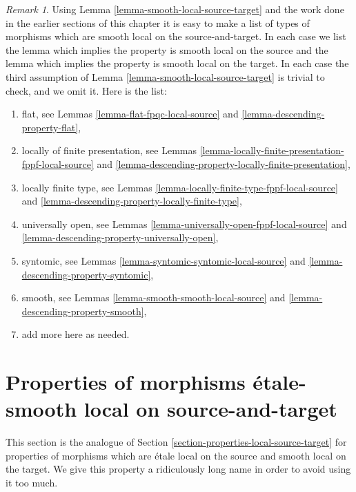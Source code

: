 \documentclass{stacks-project}
\theoremstyle{plain}
\theoremstyle{definition}
\theoremstyle{remark}
\newtheorem{remark}[subsection]{Remark}
\numberwithin{equation}{subsection}
\begin{document}
\begin{remark}
\label{remark-list-local-source-target}
Using
Lemma \ref{lemma-smooth-local-source-target}
and the work done in the earlier sections of this chapter it is easy
to make a list of types of morphisms which are smooth local on the
source-and-target. In each case we list the lemma which implies
the property is smooth local on the source and the lemma which implies
the property is smooth local on the target. In each case the third assumption
of
Lemma \ref{lemma-smooth-local-source-target}
is trivial to check, and we omit it. Here is the list:
\begin{enumerate}
\item flat, see
Lemmas \ref{lemma-flat-fpqc-local-source} and
\ref{lemma-descending-property-flat},
\item locally of finite presentation, see
Lemmas \ref{lemma-locally-finite-presentation-fppf-local-source} and
\ref{lemma-descending-property-locally-finite-presentation},
\item locally finite type, see
Lemmas \ref{lemma-locally-finite-type-fppf-local-source} and
\ref{lemma-descending-property-locally-finite-type},
\item universally open, see
Lemmas \ref{lemma-universally-open-fppf-local-source} and
\ref{lemma-descending-property-universally-open},
\item syntomic, see
Lemmas \ref{lemma-syntomic-syntomic-local-source} and
\ref{lemma-descending-property-syntomic},
\item smooth, see
Lemmas \ref{lemma-smooth-smooth-local-source} and
\ref{lemma-descending-property-smooth},
\item add more here as needed.
\end{enumerate}
\end{remark}







\section{Properties of morphisms \'etale-smooth local on source-and-target}
\label{section-properties-etale-smooth-local-source-target}

\noindent
This section is the analogue of
Section \ref{section-properties-local-source-target}
for properties of morphisms which are \'etale local
on the source and smooth local on the target.
We give this property a ridiculously long name
in order to avoid using it too much.
\end{document}
